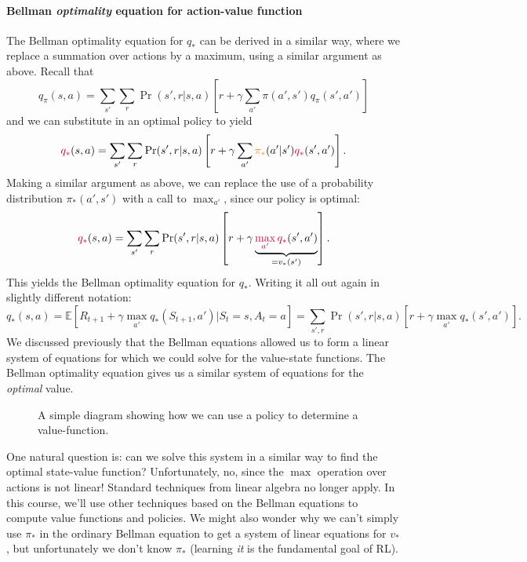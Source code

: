 \documentclass[12pt]{article}
\begin{document}
\paragraph{Bellman \emph{optimality} equation for action-value function}
The Bellman optimality equation for $q_*$ can be derived in a similar way, where we replace a summation over actions by a maximum, using a similar argument as above. Recall that
\[
q_\pi(s,a) = \sum_{s'} \sum_r\Pr(s', r|s,a) \left[ r + \gamma \sum_{a'} \pi(a',s')q_\pi(s',a')\right]
\]
and we can substitute in an optimal policy to yield
\[
  \color{purple} q_* \color{black} (s,a) = \sum_{s'} \sum_r \Pr(s',r|s,a) \left[ r + \gamma \sum_{a'} \color{orange} \pi_* \color{black} (a'|s') \color{purple} q_* \color{black}(s',a')\right].
\]
Making a similar argument as above, we can replace the use of a probability distribution $\pi_*(a',s')$ with a call to $\max_{a'}$, since our policy is optimal:
\[
  \color{purple} q_* \color{black} (s,a) = \sum_{s'} \sum_r \Pr(s',r|s,a) \left[ r + \gamma \underbrace{\color{purple} \max_{a'} \color{purple} q_* \color{black}(s',a')}_{=v_*(s')}\right].  
\]
This yields the Bellman optimality equation for $q_*$. Writing it all out again in slightly different notation:
\[
  q_*(s,a) = \mathbb E \left[R_{t+1} + \gamma \max_{a'} q_*(S_{t+1}, a') | S_t = s, A_t = a \right] = \sum_{s',r} \Pr(s', r|s,a) \left[r + \gamma \max_{a'} q_*(s', a') \right].
\]
We discussed previously that the Bellman equations allowed us to form a linear system of equations for which we could solve for the value-state functions. The Bellman optimality equation gives us a similar system of equations for the \emph{optimal} value.
\begin{figure}[h]
  \centering
  \caption{\footnotesize A simple diagram showing how we can use a policy to determine a value-function.}
\end{figure}
One natural question is: can we solve this system in a similar way to find the optimal state-value function? Unfortunately, no, since the $\max$ operation over actions is not linear! Standard techniques from linear algebra no longer apply. In this course, we'll use other techniques based on the Bellman equations to compute value functions and policies. We might also wonder why we can't simply use $\pi_*$ in the ordinary Bellman equation to get a system of linear equations for $v_*$, but unfortunately we don't know $\pi_*$ (learning \emph{it} is the fundamental goal of RL).
\end{document}
